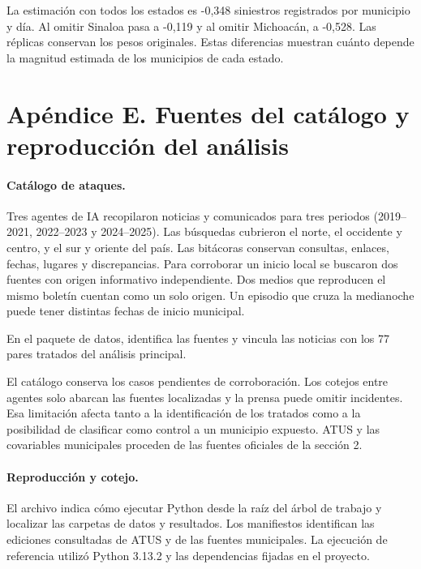 \documentclass[11pt,letterpaper]{article}
\begin{document}
La estimación con todos los estados es -0,348 siniestros registrados por municipio y día. Al omitir Sinaloa pasa a -0,119 y al omitir Michoacán, a -0,528. Las réplicas conservan los pesos originales. Estas diferencias muestran cuánto depende la magnitud estimada de los municipios de cada estado.\par

\clearpage

\section*{Apéndice E. Fuentes del catálogo y reproducción del análisis}

\paragraph{Catálogo de ataques.}

Tres agentes de IA recopilaron noticias y comunicados para tres periodos (2019--2021, 2022--2023 y 2024--2025). Las búsquedas cubrieron el norte, el occidente y centro, y el sur y oriente del país. Las bitácoras conservan consultas, enlaces, fechas, lugares y discrepancias. Para corroborar un inicio local se buscaron dos fuentes con origen informativo independiente. Dos medios que reproducen el mismo boletín cuentan como un solo origen. Un episodio que cruza la medianoche puede tener distintas fechas de inicio municipal.\par

En el paquete de datos,  identifica las fuentes y  vincula las noticias con los 77 pares tratados del análisis principal.\par

El catálogo conserva los casos pendientes de corroboración. Los cotejos entre agentes solo abarcan las fuentes localizadas y la prensa puede omitir incidentes. Esa limitación afecta tanto a la identificación de los tratados como a la posibilidad de clasificar como control a un municipio expuesto. ATUS y las covariables municipales proceden de las fuentes oficiales de la sección 2.\par

\paragraph{Reproducción y cotejo.}

El archivo  indica cómo ejecutar Python desde la raíz del árbol de trabajo y localizar las carpetas de datos y resultados. Los manifiestos identifican las ediciones consultadas de ATUS y de las fuentes municipales. La ejecución de referencia utilizó Python 3.13.2 y las dependencias fijadas en el proyecto.\par
\end{document}
